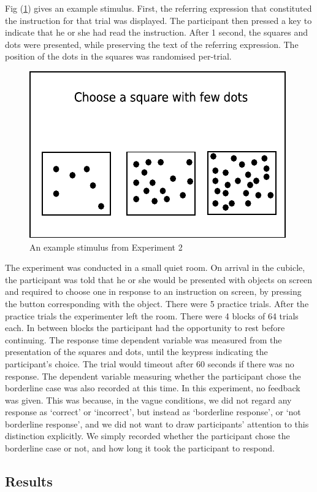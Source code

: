 \documentclass[graybox,envcountchap,sectrefs%
,footinfo
]{svmono}
\begin{document}
Fig (\ref{stimuluse2}) gives an example stimulus. First, the referring expression that constituted the instruction for that trial was displayed. The participant then pressed a key to indicate that he or she had read the instruction. After 1 second,  the squares and dots were presented, while preserving the text of the referring expression. The position of the dots in the squares was randomised per-trial.

\begin{figure}[tbp]
\centering
\includegraphics[width=.4\textwidth]{images/stimuluse2}
\caption{An example stimulus from Experiment 2}
\label{stimuluse2}
\end{figure}

The experiment was conducted in a small quiet room.
On arrival in the cubicle, the participant was told that he or she would be presented with objects on screen and required to choose one in response to an instruction on screen, by pressing the button corresponding with the object. There were 5 practice trials. After the practice trials the experimenter left the room. There were 4 blocks of 64 trials each. In between blocks the participant had the opportunity to rest before continuing. The response time dependent variable was measured from the presentation of the squares and dots, until the keypress indicating the participant's choice. The trial would timeout after 60 seconds if there was no response. The dependent variable measuring whether the participant chose the borderline case was also recorded at this time. In this experiment, no feedback was given. This was because, in the vague conditions, we did not regard any response as `correct' or `incorrect', but instead as `borderline response', or `not borderline response', and we did not want to draw participants' attention to this distinction explicitly. We simply recorded whether the participant chose the borderline case or not, and how long it took the participant to respond.

\subsection{Results}
\end{document}
